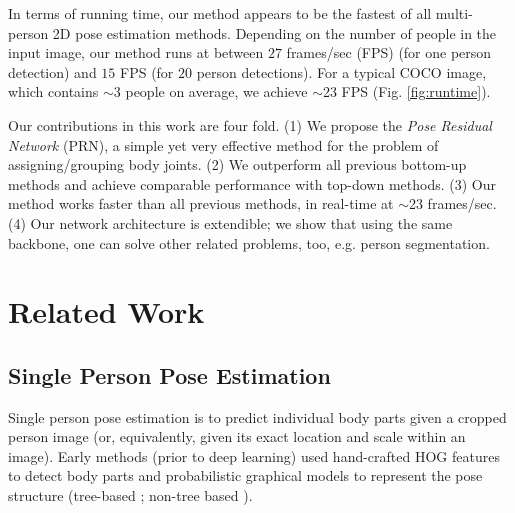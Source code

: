 \documentclass[runningheads]{llncs}
\begin{document}
In terms of running time, our method appears to be the fastest of all multi-person 2D pose estimation methods. Depending on the number of people in the input image, our method runs at between $27$ frames/sec (FPS) (for one person detection) and $15$ FPS (for $20$ person detections). For a typical COCO image, which contains $\sim$3 people on average, we achieve $\sim$23 FPS (Fig. \ref{fig:runtime}). 


Our contributions in this work are four fold. (1) We propose the \textit{Pose Residual Network} (PRN), a simple yet very effective method for the problem of assigning/grouping body joints. (2) We outperform all previous bottom-up methods and achieve comparable performance with top-down methods. (3) Our method works faster than all previous methods, in real-time at $\sim$23 frames/sec. (4) Our network architecture is extendible; we show that using the same backbone, one can solve other related problems, too, e.g. person segmentation.
 
\section{Related Work}
\subsection{Single Person Pose Estimation}
Single person pose estimation is to predict individual body parts given  a cropped person image (or, equivalently, given its exact location and scale within an image). Early methods (prior to deep learning) used hand-crafted HOG features \cite{Dalal2005} to detect body parts and probabilistic graphical models to represent the pose structure (tree-based  \cite{Pishchulin2013,Yang2011,Johnson,Andriluka2009}; non-tree based \cite{Dantone2013,Gkioxari2014}). 
\end{document}
